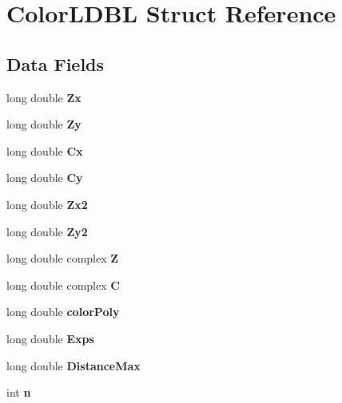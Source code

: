 \hypertarget{struct_color_l_d_b_l}{}\section{Color\+L\+D\+BL Struct Reference}
\label{struct_color_l_d_b_l}
\subsection*{Data Fields}
\begin{DoxyCompactItemize}
\item 
\mbox{\label{struct_color_l_d_b_l_a4b4b1a35d4396ec2dbbaad51f9ff4079}} 
long double {\bfseries Zx}
\item 
\mbox{\label{struct_color_l_d_b_l_a51a0c2cb239dcadc284963eb8a5ba423}} 
long double {\bfseries Zy}
\item 
\mbox{\label{struct_color_l_d_b_l_a9f083a843499dd55048426903ba90f6f}} 
long double {\bfseries Cx}
\item 
\mbox{\label{struct_color_l_d_b_l_adc2ea68700059c1af12b0f49e19e6687}} 
long double {\bfseries Cy}
\item 
\mbox{\label{struct_color_l_d_b_l_a06eed3d8aea784c0ae037921b3018bdf}} 
long double {\bfseries Zx2}
\item 
\mbox{\label{struct_color_l_d_b_l_a6c3bbba3508128ad4c78842cfbe36789}} 
long double {\bfseries Zy2}
\item 
\mbox{\label{struct_color_l_d_b_l_a61908183c296dc562365e409376785ea}} 
long double complex {\bfseries Z}
\item 
\mbox{\label{struct_color_l_d_b_l_a7ba2fec21e5a08b5f292d33ab9cf9a3c}} 
long double complex {\bfseries C}
\item 
\mbox{\label{struct_color_l_d_b_l_ab83bc1e6d6d0590aa7b5a539cc66c3e2}} 
long double {\bfseries color\+Poly}
\item 
\mbox{\label{struct_color_l_d_b_l_a1b70845f196a0f1d127570d8a926f1ce}} 
long double {\bfseries Exps}
\item 
\mbox{\label{struct_color_l_d_b_l_afe6063b806d79b291cba465a3db78fa2}} 
long double {\bfseries Distance\+Max}
\item 
\mbox{\label{struct_color_l_d_b_l_a075068bb3c5fa4e120df4f54a95f69bd}} 
int {\bfseries n}
\end{DoxyCompactItemize}


